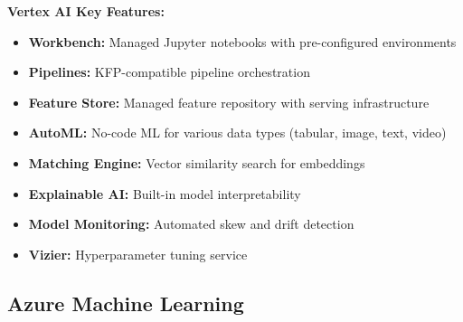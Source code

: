 \textbf{Vertex AI Key Features:}

\begin{itemize}
    \item \textbf{Workbench:} Managed Jupyter notebooks with pre-configured environments
    \item \textbf{Pipelines:} KFP-compatible pipeline orchestration
    \item \textbf{Feature Store:} Managed feature repository with serving infrastructure
    \item \textbf{AutoML:} No-code ML for various data types (tabular, image, text, video)
    \item \textbf{Matching Engine:} Vector similarity search for embeddings
    \item \textbf{Explainable AI:} Built-in model interpretability
    \item \textbf{Model Monitoring:} Automated skew and drift detection
    \item \textbf{Vizier:} Hyperparameter tuning service
\end{itemize}

\subsection{Azure Machine Learning}

